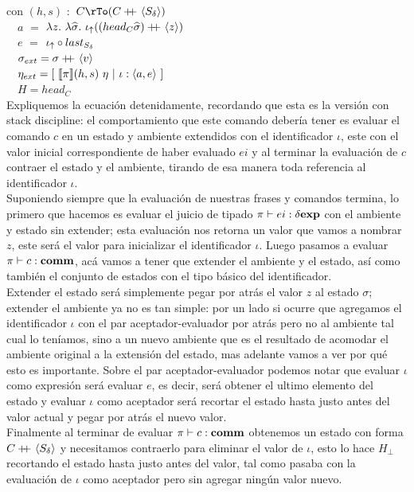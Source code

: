 con $(h,s)$ $:$ $C \rTo (C \concat \lrangles{S_\delta})$ \\
\indent \indent \ \
$a$ $=$ $\lambda z. \ \lambda \widehat{\sigma} . \ \iota_{\uparrow} ((head_{C} \widehat{\sigma}) +\kern-1.3ex+\kern0.8ex \langle z \rangle)$\\
\indent \indent \ \
$e$ $=$ $ \iota_{\uparrow} \circ last_{S_\delta}$\\
\indent \indent \ \
$\sigma_{ext} = \sigma +\kern-1.3ex+\kern0.8ex \langle v \rangle $\\
\indent \indent \ \
$\eta_{ext} = [ \ \llbracket \pi \rrbracket(h,s) \ \eta \ | \ \iota:\langle a,e \rangle \ ]$\\
\indent \indent \ \
$H = head_C$\\

\noindent
Expliquemos la ecuaci\'on detenidamente, recordando que esta es la versi\'on
con stack discipline: el comportamiento que este comando deber\'ia tener es evaluar
el comando $c$ en un estado y ambiente extendidos con el identificador $\iota$, 
este con el valor inicial correspondiente de haber evaluado $ei$
y al terminar la evaluaci\'on de $c$ contraer el estado y el ambiente, tirando
de esa manera toda referencia al identificador $\iota$.\\

Suponiendo siempre que la evaluaci\'on de nuestras frases y comandos termina, 
lo primero que hacemos es evaluar el juicio de tipado $\pi \vdash ei : \delta \textbf{exp}$
con el ambiente y estado sin extender; esta evaluaci\'on nos retorna un valor
que vamos a nombrar $z$, este ser\'a el valor para inicializar el identificador $\iota$.
Luego pasamos a evaluar $\pi \vdash c : \textbf{comm}$, ac\'a vamos a tener que extender 
el ambiente y el estado, as\'i como tambi\'en el conjunto de estados con el tipo
b\'asico del identificador. \\
Extender el estado ser\'a simplemente pegar por atr\'as el valor $z$ al estado
$\sigma$; extender el ambiente ya no es tan simple: por un lado si ocurre que 
agregamos el identificador $\iota$ con el par aceptador-evaluador por atr\'as
pero no al ambiente tal cual lo ten\'iamos, sino a un nuevo ambiente que es
el resultado de acomodar el ambiente original a la extensi\'on del estado, mas
adelante vamos a ver por qu\'e esto es importante. Sobre el par aceptador-evaluador
podemos notar que evaluar $\iota$ como expresi\'on ser\'a evaluar $e$, es decir,
ser\'a obtener el ultimo elemento del estado y evaluar $\iota$ como aceptador ser\'a
recortar el estado hasta justo antes del valor actual y pegar por atr\'as el nuevo
valor.\\
Finalmente al terminar de evaluar $\pi \vdash c : \textbf{comm}$ obtenemos un estado
con forma $C +\kern-1.3ex+\kern0.8ex \langle S_\delta \rangle$ y necesitamos contraerlo para eliminar
el valor de $\iota$, esto lo hace $H_\bot$ recortando el estado hasta justo antes
del valor, tal como pasaba con la evaluaci\'on de $\iota$ como aceptador pero
sin agregar ning\'un valor nuevo.\\


